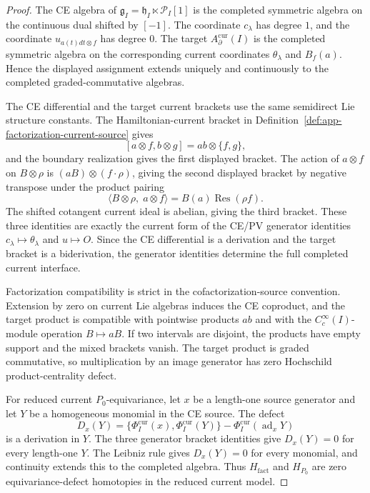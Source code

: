 \begin{proof}
  The CE algebra of
  \(\mathfrak g_I=\mathfrak h_I\ltimes\mathcal P_I[1]\) is the
  completed symmetric algebra on the continuous dual shifted by
  \([-1]\).  The coordinate \(c_\lambda\) has degree \(1\), and the
  coordinate \(u_{a(t)dt\otimes f}\) has degree \(0\).  The target
  \(A_\partial^{\mathrm{cur}}(I)\) is the completed symmetric algebra on
  the corresponding current coordinates \(\theta_\lambda\) and
  \(B_f(a)\).  Hence the displayed assignment extends uniquely and
  continuously to the completed graded-commutative algebras.

  The CE differential and the target current brackets use the same
  semidirect Lie structure constants.  The Hamiltonian-current bracket
  in Definition~\ref{def:app-factorization-current-source} gives
  \[
    [a\otimes f,b\otimes g]=ab\otimes\{f,g\},
  \]
  and the boundary realization gives the first displayed bracket.  The
  action of \(a\otimes f\) on \(B\otimes\rho\) is
  \((aB)\otimes(f\cdot\rho)\), giving the second displayed bracket by
  negative transpose under the product pairing
  \[
    \langle B\otimes\rho,\;a\otimes f\rangle
      =B(a)\operatorname{Res}(\rho f).
  \]
  The shifted cotangent current ideal is abelian, giving the third
  bracket.  These three identities are exactly the current form of the
  CE/PV generator identities \(c_\lambda\mapsto\theta_\lambda\) and
  \(u\mapsto O\).  Since the CE differential is a derivation and the
  target bracket is a biderivation, the generator identities determine
  the full completed current interface.

  Factorization compatibility is strict in the cofactorization-source
  convention.  Extension by zero on current Lie algebras induces the CE
  coproduct, and the target product is compatible with pointwise
  products \(ab\) and with the \(C_c^\infty(I)\)-module operation
  \(B\mapsto aB\).
  If two intervals are disjoint, the products have empty support and
  the mixed brackets vanish.  The target product is graded
  commutative, so multiplication by an image generator has zero
  Hochschild product-centrality defect.

  For reduced current \(P_0\)-equivariance, let \(x\) be a length-one source generator and
  let \(Y\) be a homogeneous monomial in the CE source.  The defect
  \[
    D_x(Y)=
    \{\Phi_I^{\mathrm{cur}}(x),\Phi_I^{\mathrm{cur}}(Y)\}
      -\Phi_I^{\mathrm{cur}}(\operatorname{ad}_xY)
  \]
  is a derivation in \(Y\).  The three generator bracket identities
  give \(D_x(Y)=0\) for every length-one \(Y\).  The Leibniz rule gives
  \(D_x(Y)=0\) for every monomial, and continuity extends this to the
  completed algebra.  Thus \(H_{\mathrm{fact}}\) and \(H_{P_0}\) are
  zero equivariance-defect homotopies in the reduced current model.
\end{proof}

